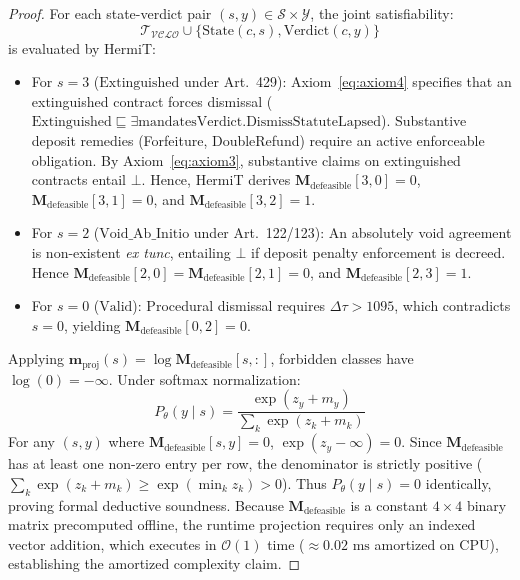 \documentclass[11pt,a4paper]{article}
\begin{document}
\begin{proof}
For each state-verdict pair $(s, y) \in \mathcal{S} \times \mathcal{Y}$, the joint satisfiability:
\begin{equation}
\mathcal{T}_{\mathcal{VCLO}} \cup \{ \mathrm{State}(c, s), \mathrm{Verdict}(c, y) \}
\end{equation}
is evaluated by HermiT:
\begin{itemize}[leftmargin=*]
\item For $s = 3$ ($\text{Extinguished}$ under Art.~429): Axiom~\eqref{eq:axiom4} specifies that an extinguished contract forces dismissal ($\text{Extinguished} \sqsubseteq \exists \text{mandatesVerdict}.\text{DismissStatuteLapsed}$). Substantive deposit remedies (Forfeiture, DoubleRefund) require an active enforceable obligation. By Axiom~\eqref{eq:axiom3}, substantive claims on extinguished contracts entail $\bot$. Hence, HermiT derives $\mathbf{M}_{\text{defeasible}}[3, 0] = 0$, $\mathbf{M}_{\text{defeasible}}[3, 1] = 0$, and $\mathbf{M}_{\text{defeasible}}[3, 2] = 1$.
\item For $s = 2$ ($\text{Void\_Ab\_Initio}$ under Art.~122/123): An absolutely void agreement is non-existent \textit{ex tunc}, entailing $\bot$ if deposit penalty enforcement is decreed. Hence $\mathbf{M}_{\text{defeasible}}[2, 0] = \mathbf{M}_{\text{defeasible}}[2, 1] = 0$, and $\mathbf{M}_{\text{defeasible}}[2, 3] = 1$.
\item For $s = 0$ ($\text{Valid}$): Procedural dismissal requires $\Delta \tau > 1095$, which contradicts $s = 0$, yielding $\mathbf{M}_{\text{defeasible}}[0, 2] = 0$.
\end{itemize}
Applying $\mathbf{m}_{\text{proj}}(s) = \log \mathbf{M}_{\text{defeasible}}[s, :]$, forbidden classes have $\log(0) = -\infty$.
Under softmax normalization:
\begin{equation}
P_\theta(y \mid s) = \frac{\exp(z_y + m_y)}{\sum_k \exp(z_k + m_k)}
\end{equation}
For any $(s, y)$ where $\mathbf{M}_{\text{defeasible}}[s, y] = 0$, $\exp(z_y - \infty) = 0$. Since $\mathbf{M}_{\text{defeasible}}$ has at least one non-zero entry per row, the denominator is strictly positive ($\sum_k \exp(z_k + m_k) \ge \exp(\min_k z_k) > 0$). Thus $P_\theta(y \mid s) = 0$ identically, proving formal deductive soundness.
Because $\mathbf{M}_{\text{defeasible}}$ is a constant $4 \times 4$ binary matrix precomputed offline, the runtime projection requires only an indexed vector addition, which executes in $\mathcal{O}(1)$ time ($\approx 0.02\text{ ms}$ amortized on CPU), establishing the amortized complexity claim.
\end{proof}
\end{document}
